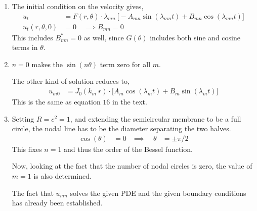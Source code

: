 \begin{enumerate}
    \item The initial condition on the velocity gives,
          \begin{align}
              u_t               & = F(r, \theta) \cdot \lambda_{mn}
              \ \Big[-A_{mn}\sin(\lambda_{mn}t) + B_{mn}\cos(\lambda_{mn}t)\Big] \\
              u_t(r, \theta, 0) & = 0 \quad \implies B_{mn} = 0
          \end{align}
          This includes $ B^*_{mn} = 0 $ as well, since $ G(\theta) $ includes both
          sine and cosine terms in $ \theta $.

    \item $ n=0 $ makes the $ \sin(n\theta) $ term zero for all $ m $. \par
          The other kind of solution reduces to,
          \begin{align}
              u_{m0} & = J_0(k_m\ r) \cdot \Big[ A_m \cos(\lambda_m t) +
                  B_m \sin(\lambda_m t) \Big]
          \end{align}
          This is the same as equation $ 16 $ in the text.

    \item Setting $ R = c^2 = 1 $, and extending the semicircular membrane to be a
          full circle, the nodal line has to be the diameter separating the two halves.
          \begin{align}
              \cos(\theta)          & = 0         &
              \implies \quad \theta & = \pm \pi/2
          \end{align}
          This fixes $ n = 1 $ and thus the order of the Bessel function. \par
          Now, looking at the fact that the number of nodal circles is zero, the value
          of $ m = 1 $ is also determined. \par
          The fact that $ u_{mn} $ solves the given PDE and the given boundary
          conditions has already been established.
\end{enumerate}
